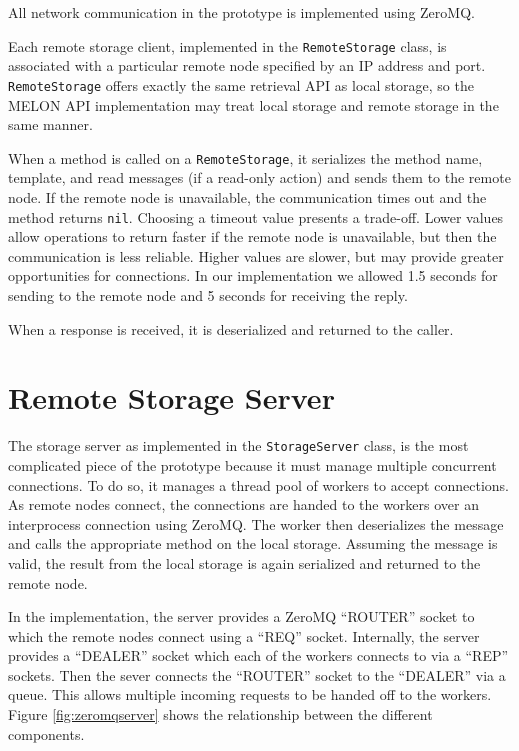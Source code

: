 All network communication in the prototype is implemented using ZeroMQ.

Each remote storage client, implemented in the \texttt{RemoteStorage} class, is associated with a particular remote node specified by an IP address and port. \texttt{RemoteStorage} offers exactly the same retrieval API as local storage, so the MELON API implementation may treat local storage and remote storage in the same manner.

When a method is called on a \texttt{RemoteStorage}, it serializes the method name, template, and read messages (if a read-only action) and sends them to the remote node. If the remote node is unavailable, the communication times out and the method returns \texttt{nil}. Choosing a timeout value presents a trade-off. Lower values allow operations to return faster if the remote node is unavailable, but then the communication is less reliable. Higher values are slower, but may provide greater opportunities for connections. In our implementation we allowed 1.5 seconds for sending to the remote node and 5 seconds for receiving the reply.

When a response is received, it is deserialized and returned to the caller.

\section{Remote Storage Server}

The storage server as implemented in the \texttt{StorageServer} class, is the most complicated piece of the prototype because it must manage multiple concurrent connections. To do so, it manages a thread pool of workers to accept connections. As remote nodes connect, the connections are handed to the workers over an interprocess connection using ZeroMQ. The worker then deserializes the message and calls the appropriate method on the local storage. Assuming the message is valid, the result from the local storage is again serialized and returned to the remote node.

In the implementation, the server provides a ZeroMQ ``ROUTER'' socket to which the remote nodes connect using a ``REQ'' socket. Internally, the server provides a ``DEALER'' socket which each of the workers connects to via a ``REP'' sockets. Then the sever connects the ``ROUTER'' socket to the ``DEALER'' via a queue. This allows multiple incoming requests to be handed off to the workers. Figure \ref{fig:zeromqserver} shows the relationship between the different components.

